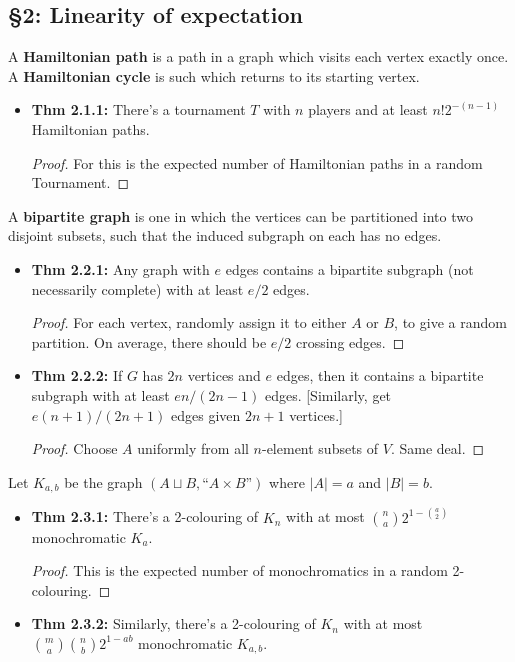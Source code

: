 \documentclass[11pt]{article}
\newenvironment{INT}[1][]{\begin{itemize}\small\item\textbf{#1}}{\end{itemize}}
\newcommand{\moreINT}[1][]{\item\textbf{#1}}
\begin{document}
\begin{chapter2}
\section*{\S2: Linearity of expectation}
\begin{itemise}
\item A \textbf{Hamiltonian path} is a path in a graph which visits each vertex exactly once. A \textbf{Hamiltonian cycle} is such which returns to its starting vertex.
\begin{INT}[Thm 2.1.1:]
There's a tournament $T$ with $n$ players and at least $n!2^{-(n-1)}$ Hamiltonian paths.
\begin{proof}
For this is the expected number of Hamiltonian paths in a random Tournament.
\end{proof}
\end{INT}
\item A \textbf{bipartite graph} is one in which the vertices can be partitioned into two disjoint subsets, such that the induced subgraph on each has no edges.
\begin{INT}[Thm 2.2.1:]
Any graph with $e$ edges contains a bipartite subgraph (not necessarily complete) with at least $e/2$ edges.
\begin{proof}
For each vertex, randomly assign it to either $A$ or $B$, to give a random partition. On average, there should be $e/2$ crossing edges.
\end{proof}
\moreINT[Thm 2.2.2:]
If $G$ has $2n$ vertices and $e$ edges, then it contains a bipartite subgraph with at least $en/(2n-1)$ edges. [Similarly, get $e(n+1)/(2n+1)$ edges given $2n+1$ vertices.]
\begin{proof}
Choose $A$ uniformly from all $n$-element subsets of $V$. Same deal.
\end{proof}
\end{INT}
\item {}
\item Let $K_{a,b}$ be the graph $(A\sqcup B,\text{``$A\times B$''})$ where $|A|=a$ and $|B|=b$.
\begin{INT}[Thm 2.3.1:]
There's a 2-colouring of $K_n$ with at most ${n\choose a}2^{1-{a\choose 2}}$ monochromatic $K_a$.
\begin{proof}
This is the expected number of monochromatics in a random 2-colouring.
\end{proof}
\moreINT[Thm 2.3.2:] Similarly, there's a 2-colouring of $K_n$ with at most ${m\choose a}{n\choose b}2^{1-ab}$ monochromatic $K_{a,b}$.

\end{INT}
\end{itemise}
\end{chapter2}
\end{document}
